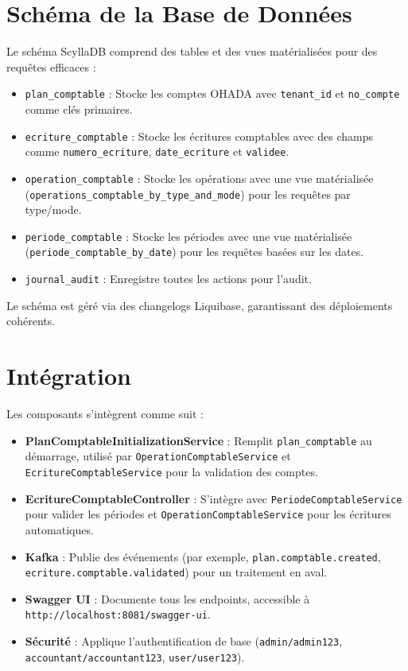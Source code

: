 \documentclass[a4paper,12pt]{article}
\begin{document}
\section{Schéma de la Base de Données}
Le schéma ScyllaDB comprend des tables et des vues matérialisées pour des requêtes efficaces :
\begin{itemize}
    \item \texttt{plan_comptable} : Stocke les comptes OHADA avec \texttt{tenant_id} et \texttt{no_compte} comme clés primaires.
    \item \texttt{ecriture_comptable} : Stocke les écritures comptables avec des champs comme \texttt{numero_ecriture}, \texttt{date_ecriture} et \texttt{validee}.
    \item \texttt{operation_comptable} : Stocke les opérations avec une vue matérialisée (\texttt{operations_comptable_by_type_and_mode}) pour les requêtes par type/mode.
    \item \texttt{periode_comptable} : Stocke les périodes avec une vue matérialisée (\texttt{periode_comptable_by_date}) pour les requêtes basées sur les dates.
    \item \texttt{journal_audit} : Enregistre toutes les actions pour l'audit.
\end{itemize}
Le schéma est géré via des changelogs Liquibase, garantissant des déploiements cohérents.

\section{Intégration}
Les composants s'intègrent comme suit :
\begin{itemize}
    \item \textbf{PlanComptableInitializationService} : Remplit \texttt{plan_comptable} au démarrage, utilisé par \texttt{OperationComptableService} et \texttt{EcritureComptableService} pour la validation des comptes.
    \item \textbf{EcritureComptableController} : S'intègre avec \texttt{PeriodeComptableService} pour valider les périodes et \texttt{OperationComptableService} pour les écritures automatiques.
    \item \textbf{Kafka} : Publie des événements (par exemple, \texttt{plan.comptable.created}, \texttt{ecriture.comptable.validated}) pour un traitement en aval.
    \item \textbf{Swagger UI} : Documente tous les endpoints, accessible à \texttt{http://localhost:8081/swagger-ui}.
    \item \textbf{Sécurité} : Applique l'authentification de base (\texttt{admin/admin123}, \texttt{accountant/accountant123}, \texttt{user/user123}).
\end{itemize}
\end{document}
